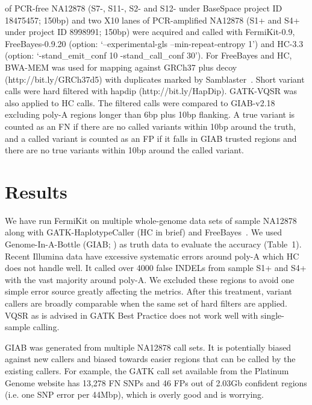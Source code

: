 \documentclass{bioinfo}
\begin{document}
\begin{table}[t]
{of PCR-free NA12878 (S7-, S11-, S2- and S12- under BaseSpace project ID
18475457; 150bp) and two X10 lanes of PCR-amplified NA12878 (S1+ and S4+ under project
ID 8998991; 150bp) were acquired and called with FermiKit-0.9, FreeBayes-0.9.20
(option: `--experimental-gls --min-repeat-entropy 1') and HC-3.3 (option:
`-stand\_emit\_conf 10 -stand\_call\_conf 30'). For FreeBayes and HC, BWA-MEM
was used for mapping against GRCh37 plus decoy (http://bit.ly/GRCh37d5) with duplicates marked by
Samblaster~\citep{Faust:2014aa}.  Short variant calls were hard filtered with
hapdip (http://bit.ly/HapDip). GATK-VQSR was also applied to HC calls. The
filtered calls were compared to GIAB-v2.18 excluding poly-A regions longer than
6bp plus 10bp flanking. A true variant is counted as an FN if there are no
called variants within 10bp around the truth, and a called variant is counted
as an FP if it falls in GIAB trusted regions and there are no true variants
within 10bp around the called variant.}
\end{table}

\section{Results}
We have run FermiKit on multiple whole-genome data sets of sample NA12878 along with
GATK-HaplotypeCaller (HC in brief) and FreeBayes~\citep{Garrison:2012aa}.
We used Genome-In-A-Bottle (GIAB; \citealt{Zook:2014ab}) as truth data
to evaluate the accuracy (Table~1). Recent Illumina data have excessive
systematic errors around poly-A which HC does not handle well. It called over
4000 false INDELs from sample S1+ and S4+ with the vast majority around poly-A.
We excluded these regions to avoid one simple error source greatly affecting
the metrics. After this treatment, variant callers are broadly comparable when
the same set of hard filters are applied. VQSR as is advised in GATK Best
Practice does not work well with single-sample calling.

GIAB was generated from multiple NA12878 call sets. It is potentially biased
against new callers and biased towards easier regions that can be called by the
existing callers. For example, the GATK call set available from the Platinum
Genome website has 13,278 FN SNPs and 46 FPs out of 2.03Gb confident regions
(i.e. one SNP error per 44Mbp), which is overly good and is worrying.
\end{document}
